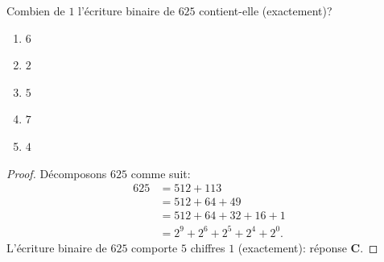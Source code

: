 % 
%
Combien de $1$ l'écriture binaire de $625$ contient-elle (exactement)?
%
\begin{enumerate}
  \item $6$
  \item $2$
  \item $5$
  \item $7$
  \item $4$
\end{enumerate}
%
\begin{proof}
Décomposons $625$ comme suit:
%
\begin{align}
  625 &= 512 + 113 \\
  &= 512 + 64 + 49 \\
  &= 512 + 64 + 32 + 16 + 1\\
  &= 2^9 + 2^6 + 2^5 + 2^4 + 2^0.
\end{align}
L'écriture binaire de $625$ comporte $5$ chiffres $1$ (exactement): réponse \textbf{C}.
\end{proof}